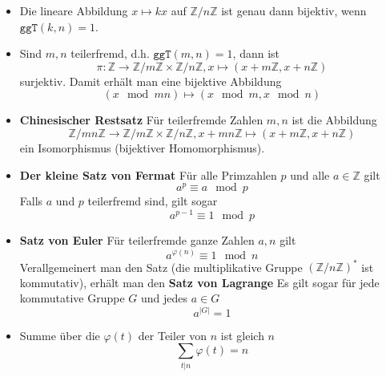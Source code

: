 \documentclass[landscape, 8pt, a4paper]{extarticle}
\newcommand{\ggT}{\texttt{ggT}}
\newcommand{\Z}{\mathbb{Z}}
\begin{document}
\begin{multicols}{3}
\begin{itemize}
		\item Die lineare Abbildung $x\mapsto kx$ auf $\Z/n\Z$ ist genau dann bijektiv, wenn $\ggT(k,n)=1$.
		
		\item Sind $m,n$ teilerfremd, d.h. $\ggT(m,n)=1$, dann ist
		\begin{equation*}
			\pi:\Z\rightarrow\Z/m\Z\times\Z/n\Z, x\mapsto(x+m\Z,x+n\Z)
		\end{equation*}
		surjektiv. Damit erhält man eine bijektive Abbildung
		\begin{equation*}
			(x\mod mn)\mapsto (x\mod m,x\mod n)
		\end{equation*}
		\item \textbf{Chinesischer Restsatz}
		Für teilerfremde Zahlen $m,n$ ist die Abbildung
		\begin{equation*}
			\Z/mn\Z\rightarrow \Z/m\Z\times \Z/n\Z, 
			x+mn\Z\mapsto (x+m\Z,x+n\Z)
		\end{equation*}
		ein Isomorphismus (bijektiver Homomorphismus).

		\item \textbf{Der kleine Satz von Fermat} Für alle Primzahlen $p$ und alle $a\in\Z$ gilt
		\begin{equation*}
			a^p\equiv a\mod p
		\end{equation*}
		Falls $a$ und $p$ teilerfremd sind, gilt sogar
		\begin{equation*}
			a^{p-1}\equiv 1\mod p
		\end{equation*}

		\item \textbf{Satz von Euler} Für teilerfremde ganze Zahlen $a,n$ gilt
		\begin{equation*}
			a^{\varphi(n)}\equiv 1 \mod n
		\end{equation*}
		Verallgemeinert man den Satz (die multiplikative Gruppe $(\Z/n\Z)^\ast$ ist kommutativ), erhält man den \textbf{Satz von Lagrange} Es gilt sogar für jede kommutative Gruppe $G$ und jedes $a\in G$ 
		\begin{equation*}
		 	a^{|G|}=1
		\end{equation*} 

		\item Summe über die $\varphi(t)$ der Teiler von $n$ ist gleich $n$
		\begin{equation*}
			\sum_{t|n}\varphi(t)=n
		\end{equation*}
	\end{itemize}

\end{multicols}
\end{document}
